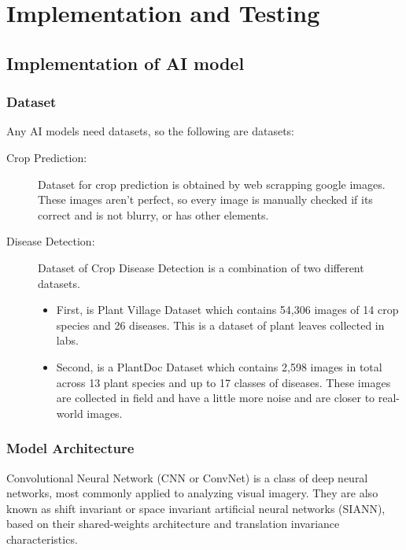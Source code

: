 \documentclass[../Report.tex]{subfiles}
\begin{document}
\chapter{Implementation and Testing} \label{chap:imp_test}

\section{Implementation of AI model}

\subsection{Dataset}
\noindent Any AI models need datasets, so the following are datasets:
\begin{description}
  \item[Crop Prediction:] Dataset for crop prediction is obtained by web scrapping google images. These images aren't perfect, so every image
  is manually checked if its correct and is not blurry, or has other elements.

  \item[Disease Detection:] Dataset of Crop Disease Detection is a combination of two different datasets.
  \begin{itemize}
    \item First, is Plant Village Dataset\cite{disease_dataset} which contains 54,306 images of 14 crop species and 26 diseases. This is a 
    dataset of plant leaves collected in labs.

    \item Second, is a PlantDoc Dataset\cite{plactdoc} which contains 2,598 images in total across 13 plant species and up to 17 classes 
    of diseases. These images are collected in field and have a little more noise and are closer to real-world images.
  \end{itemize}
\end{description}

\subsection{Model Architecture}
Convolutional Neural Network (CNN or ConvNet) \cite{cnn} is a class of deep neural networks, most commonly applied to analyzing visual imagery.
They are also known as shift invariant or space invariant artificial neural networks (SIANN), based on their shared-weights architecture and 
translation invariance characteristics.\par
\end{document}

